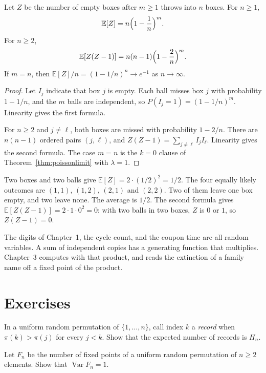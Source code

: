 \begin{proposition}\label{prop:empty}
Let $Z$ be the number of empty boxes after $m\ge1$ throws into $n$ boxes. For $n\ge1$,
\[
 \mathbb E[Z]=n\Bigl(1-\frac1n\Bigr)^m.
\]
For $n\ge2$,
\[
 \mathbb E[Z(Z-1)]=n(n-1)\Bigl(1-\frac2n\Bigr)^m.
\]
If $m=n$, then $\mathbb E[Z]/n=(1-1/n)^n\to e^{-1}$ as $n\to\infty$.
\end{proposition}
\begin{proof}
Let $I_j$ indicate that box $j$ is empty. Each ball misses box $j$ with probability $1-1/n$, and the $m$ balls are independent, so $P(I_j=1)=(1-1/n)^m$. Linearity gives the first formula.

For $n\ge2$ and $j\ne\ell$, both boxes are missed with probability $1-2/n$. There are $n(n-1)$ ordered pairs $(j,\ell)$, and $Z(Z-1)=\sum_{j\ne\ell}I_jI_\ell$. Linearity gives the second formula. The case $m=n$ is the $k=0$ clause of Theorem~\ref{thm:poissonlimit} with $\lambda=1$.
\end{proof}

Two boxes and two balls give $\mathbb E[Z]=2\cdot(1/2)^2=1/2$. The four equally likely outcomes are $(1,1)$, $(1,2)$, $(2,1)$ and $(2,2)$. Two of them leave one box empty, and two leave none. The average is $1/2$. The second formula gives $\mathbb E[Z(Z-1)]=2\cdot1\cdot0^2=0$: with two balls in two boxes, $Z$ is $0$ or $1$, so $Z(Z-1)=0$.

The digits of Chapter~1, the cycle count, and the coupon time are all random variables. A sum of independent copies has a generating function that multiplies. Chapter~3 computes with that product, and reads the extinction of a family name off a fixed point of the product.

\section{Exercises}

\begin{exercise}[$\star$]\label{ex:records}
In a uniform random permutation of $\{1,\ldots,n\}$, call index $k$ a \emph{record} when $\pi(k)>\pi(j)$ for every $j<k$. Show that the expected number of records is $H_n$.
\end{exercise}

\begin{exercise}[$\star\star$]\label{ex:fixedvar}
Let $F_n$ be the number of fixed points of a uniform random permutation of $n\ge2$ elements. Show that $\operatorname{Var}F_n=1$.
\end{exercise}

